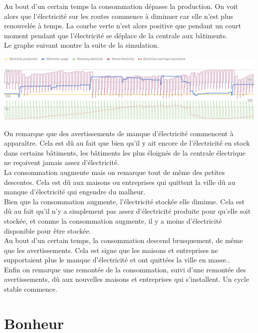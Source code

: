 \documentclass[11pt]{report}
\begin{document}
Au bout d'un certain temps la consommation dépasse la production. On voit alors que l'électricité sur les routes commence à diminuer car elle n'est plus renouvelée à temps. La courbe verte n'est alors positive que pendant un court moment pendant que l'électricité se déplace de la centrale aux bâtiments.\\
Le graphe suivant montre la suite de la simulation.
\begin{center}
	\includegraphics[width=\textwidth]{electricity_storage_2}
\end{center}
On remarque que des avertissements de manque d'électricité commencent à apparaître. Cela est dû au fait que bien qu'il y ait encore de l'électricité en stock dans certains bâtiments, les bâtiments les plus éloignés de la centrale électrique ne reçoivent jamais assez d'électricité.\\
La consommation augmente mais on remarque tout de même des petites descentes. Cela est dû aux maisons ou entreprises qui quittent la ville dû au manque d'électricité qui engendre du malheur.\\
Bien que la consommation augmente, l'électricité stockée elle diminue. Cela est dû au fait qu'il n'y a simplement pas assez d'électricité produite pour qu'elle soit stockée, et comme la consommation augmente, il y a moins d'électricité disponible pour être stockée.\\
Au bout d'un certain temps, la consommation descend brusquement, de même que les avertissements. Cela est signe que les maisons et entreprises ne supportaient plus le manque d'électricité et ont quittées la ville en masse..\\
Enfin on remarque une remontée de la consommation, suivi d'une remontée des avertissements, dû aux nouvelles maisons et entreprises qui s'installent. Un cycle stable commence.


\section{Bonheur}
\end{document}
